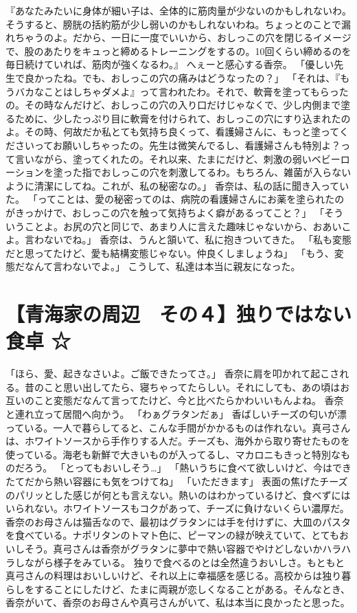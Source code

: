 『あなたみたいに身体が細い子は、全体的に筋肉量が少ないのかもしれないわ。そうすると、膀胱の括約筋が少し弱いのかもしれないわね。ちょっとのことで漏れちゃうのよ。だから、一日に一度でいいから、おしっこの穴を閉じるイメージで、股のあたりをキュっと締めるトレーニングをするの。10回くらい締めるのを毎日続けていれば、筋肉が強くなるわ。』
へぇーと感心する香奈。
「優しい先生で良かったね。でも、おしっこの穴の痛みはどうなったの？」
「それは、『もうバカなことはしちゃダメよ』って言われたわ。それで、軟膏を塗ってもらったの。その時なんだけど、おしっこの穴の入り口だけじゃなくで、少し内側まで塗るために、少したっぷり目に軟膏を付けられて、おしっこの穴にすり込まれたのよ。その時、何故だか私とても気持ち良くって、看護婦さんに、もっと塗ってくださいってお願いしちゃったの。先生は微笑んでるし、看護婦さんも特別よ？って言いながら、塗ってくれたの。それ以来、たまにだけど、刺激の弱いベビーローションを塗った指でおしっこの穴を刺激してるわ。もちろん、雑菌が入らないように清潔にしてね。これが、私の秘密なの。」
香奈は、私の話に聞き入っていた。
「ってことは、愛の秘密ってのは、病院の看護婦さんにお薬を塗られたのがきっかけで、おしっこの穴を触って気持ちよく癖があるってこと？」
「そういうことよ。お尻の穴と同じで、あまり人に言えた趣味じゃないから、おあいこよ。言わないでね。」
香奈は、うんと頷いて、私に抱きついてきた。
「私も変態だと思ってたけど、愛も結構変態じゃない。仲良くしましょうね」
「もう、変態だなんて言わないでよ。」
こうして、私達は本当に親友になった。


\section{【青海家の周辺　その４】独りではない食卓 ☆}

「ほら、愛、起きなさいよ。ご飯できたってさ。」
香奈に肩を叩かれて起こされる。昔のこと思い出してたら、寝ちゃってたらしい。それにしても、あの頃はお互いのこと変態だなんて言ってたけど、今と比べたらかわいいもんよね。
香奈と連れ立って居間へ向かう。
「わぁグラタンだぁ」
香ばしいチーズの匂いが漂っている。一人で暮らしてると、こんな手間がかかるものは作れない。真弓さんは、ホワイトソースから手作りする人だ。チーズも、海外から取り寄せたものを使っている。海老も新鮮で大きいものが入ってるし、マカロニもきっと特別なものだろう。
「とってもおいしそう…」
「熱いうちに食べて欲しいけど、今はできたてだから熱い容器にも気をつけてね」
「いただきます」
表面の焦げたチーズのパリッとした感じが何とも言えない。熱いのはわかっているけど、食べずにはいられない。ホワイトソースもコクがあって、チーズに負けないくらい濃厚だ。香奈のお母さんは猫舌なので、最初はグラタンには手を付けずに、大皿のパスタを食べている。ナポリタンのトマト色に、ピーマンの緑が映えていて、とてもおいしそう。真弓さんは香奈がグラタンに夢中で熱い容器でやけどしないかハラハラしながら様子をみている。
独りで食べるのとは全然違うおいしさ。もともと真弓さんの料理はおいしいけど、それ以上に幸福感を感じる。高校からは独り暮らしをすることにしたけど、たまに両親が恋しくなることがある。そんなとき、香奈がいて、香奈のお母さんや真弓さんがいて、私は本当に良かったと思った。


